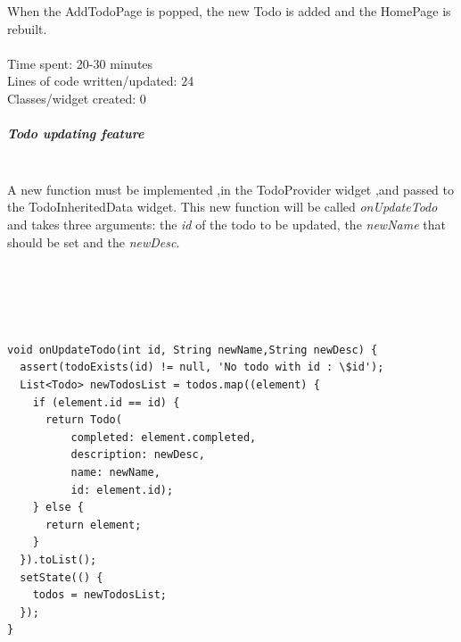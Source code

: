 When the AddTodoPage is popped, the new Todo is added and the HomePage is rebuilt.\\
\\

Time spent: 20-30 minutes\\
Lines of code written/updated: 24\\ 
Classes/widget created: 0\\

\subparagraph{Todo updating feature} \mbox{} \\
\label{subpar:todo_updating_feature_inherited_wdiget}
A new function must be implemented ,in the TodoProvider widget ,and passed to the TodoInheritedData widget. This new function will be called \textit{onUpdateTodo } and takes three arguments: the \textit{id} of the todo to be updated, the \textit{newName } that should be set and the \textit{newDesc}.

\mbox{}\\

\begin{code}
\mbox{}\\
\label{code:2.37} 
\begin{verbatim}

void onUpdateTodo(int id, String newName,String newDesc) {
  assert(todoExists(id) != null, 'No todo with id : \$id');
  List<Todo> newTodosList = todos.map((element) {
    if (element.id == id) {
      return Todo(
          completed: element.completed,
          description: newDesc,
          name: newName,
          id: element.id);
    } else {
      return element;
    }
  }).toList();
  setState(() {
    todos = newTodosList;
  });
}

\end{verbatim}
\end{code}
\mbox{}\\



